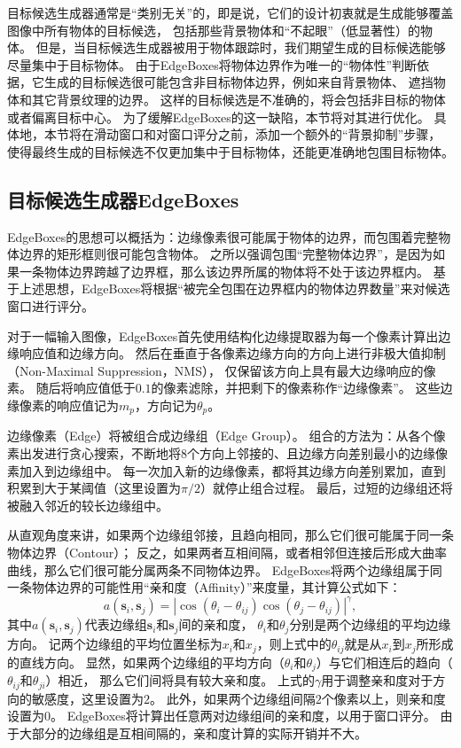 目标候选生成器通常是``类别无关''的，即是说，它们的设计初衷就是生成能够覆盖图像中所有物体的目标候选，
包括那些背景物体和``不起眼''（低显著性）的物体。
但是，当目标候选生成器被用于物体跟踪时，我们期望生成的目标候选能够尽量集中于目标物体。
由于EdgeBoxes将物体边界作为唯一的``物体性''判断依据，它生成的目标候选很可能包含非目标物体边界，例如来自背景物体、
遮挡物体和其它背景纹理的边界。
这样的目标候选是不准确的，将会包括非目标的物体或者偏离目标中心。
为了缓解EdgeBoxes的这一缺陷，本节将对其进行优化。
具体地，本节将在滑动窗口和对窗口评分之前，添加一个额外的``背景抑制''步骤，
使得最终生成的目标候选不仅更加集中于目标物体，还能更准确地包围目标物体。

\subsection{目标候选生成器EdgeBoxes}
EdgeBoxes的思想可以概括为：边缘像素很可能属于物体的边界，而包围着完整物体边界的矩形框则很可能包含物体。
之所以强调包围``完整物体边界''，是因为如果一条物体边界跨越了边界框，那么该边界所属的物体将不处于该边界框内。
基于上述思想，EdgeBoxes将根据``被完全包围在边界框内的物体边界数量''来对候选窗口进行评分。

对于一幅输入图像，EdgeBoxes首先使用结构化边缘提取器为每一个像素计算出边缘响应值和边缘方向。
然后在垂直于各像素边缘方向的方向上进行非极大值抑制（Non-Maximal Suppression，NMS），
仅保留该方向上具有最大边缘响应的像素。
随后将响应值低于$0.1$的像素滤除，并把剩下的像素称作``边缘像素''。
这些边缘像素的响应值记为$m_p$，方向记为$\theta_p$。

边缘像素（Edge）将被组合成边缘组（Edge Group）。
组合的方法为：从各个像素出发进行贪心搜索，不断地将8个方向上邻接的、且边缘方向差别最小的边缘像素加入到边缘组中。
每一次加入新的边缘像素，都将其边缘方向差别累加，直到积累到大于某阈值（这里设置为$\pi/2$）就停止组合过程。
最后，过短的边缘组还将被融入邻近的较长边缘组中。

从直观角度来讲，如果两个边缘组邻接，且趋向相同，那么它们很可能属于同一条物体边界（Contour）；
反之，如果两者互相间隔，或者相邻但连接后形成大曲率曲线，那么它们很可能分属两条不同物体边界。
EdgeBoxes将两个边缘组属于同一条物体边界的可能性用``亲和度（Affinity）''来度量，其计算公式如下：
\begin{equation}
a(\textbf{s}_i,\textbf{s}_j)=|\cos(\theta_i-\theta_{ij})\cos(\theta_j-\theta_{ij})|^\gamma, \label{edge_affinity}
\end{equation}
其中$a(\textbf{s}_i,\textbf{s}_j)$代表边缘组$\textbf{s}_i$和$\textbf{s}_j$间的亲和度，
$\theta_{i}$和$\theta_{j}$分别是两个边缘组的平均边缘方向。
记两个边缘组的平均位置坐标为$x_i$和$x_j$，则上式中的$\theta_{ij}$就是从$x_i$到$x_j$所形成的直线方向。
显然，如果两个边缘组的平均方向（$\theta_{i}$和$\theta_{j}$）与它们相连后的趋向（$\theta_{ij}$和$\theta_{ji}$）相近，
那么它们间将具有较大亲和度。
上式的$\gamma$用于调整亲和度对于方向的敏感度，这里设置为$2$。
此外，如果两个边缘组间隔$2$个像素以上，则亲和度设置为$0$。
EdgeBoxes将计算出任意两对边缘组间的亲和度，以用于窗口评分。
由于大部分的边缘组是互相间隔的，亲和度计算的实际开销并不大。


